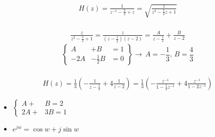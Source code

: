 \documentclass[10pt, fleqn]{article}
\begin{document}
\begin{align*}H \left(z \right)= \frac{1 }{z ^{-1 }- \frac{5 }{2 }+ z }= \sqrt{\frac{z }{z ^{2 }- \frac{5 }{2 }z + 1 }}\end{align*}
\\ 
\begin{align*}\frac{z }{z ^{2 }- \frac{5 }{2 }+ 1 }= \frac{z }{\left(z - \frac{1 }{2 }\right)\left(z - 2 \right)}= \frac{A }{z - \frac{1 }{2 }}+ \frac{B }{z - 2 }\end{align*}
\begin{equation*}\left\{\begin{alignedat}{2}A & + B & = 1 \\ -2 A & - \frac{1 }{2 }B & = 0 \end{alignedat}\right\}\rightarrow \, A = - \frac{1 }{3 }, \, B = \frac{4 }{3 }\end{equation*}
\\ 
\begin{align*}H \left(z \right)= \frac{1 }{3 }\left(- \frac{1 }{z - \frac{1 }{2 }}+ 4 \frac{1 }{z - 2 }\right)= \frac{1 }{3 }\left(- \frac{z ^{-1 }}{1 - \frac{1 }{2 }z ^{-1 }}+ 4 \frac{z ^{-1 }}{1 - 2 z ^{- 1 }}\right)\end{align*}
\begin{itemize}\item $\begin{cases}A + & B = 2 \\ 2A + & 3B = 1 \end{cases}$\item {}$e ^{jw }= \cos w + j \sin w $\end{itemize}
\end{document}
